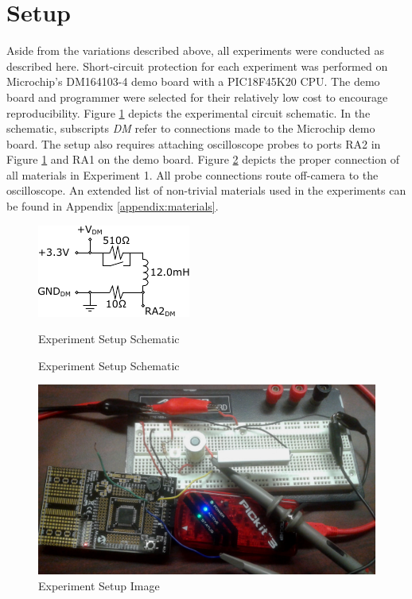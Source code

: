 \documentclass[11pt,oneside]{report}
\begin{document}
    \section*{Setup}
    Aside from the variations described above, all experiments were conducted as described here. Short-circuit protection for each experiment was performed on Microchip's DM164103-4 demo board with a PIC18F45K20 CPU. The demo board and programmer were selected for their relatively low cost to encourage reproducibility. 
    Figure \ref{fig:ExperimentSetup} depicts the experimental circuit schematic. In the schematic, subscripts \textit{DM} refer to connections made to the Microchip demo board. The setup also requires attaching oscilloscope probes to ports RA2 in Figure \ref{fig:ExperimentSetup} and RA1 on the demo board. Figure \ref{fig:Experiment1Setup} depicts the proper connection of all materials in Experiment 1. All probe connections route off-camera to the oscilloscope. An extended list of non-trivial materials used in the experiments can be found in Appendix \ref{appendix:materials}.
    \begin{figure}
        \centering
        \includegraphics[width=0.45\linewidth]{img/Experiment_Setup.pdf}
        \caption{Experiment Setup Schematic} Experiment Setup Schematic
        \label{fig:ExperimentSetup}
    \end{figure}
    
    \begin{figure}
    	\centering
        \includegraphics[width=0.75\linewidth]{img/SCD_5_9mH_EXP_SETUP.jpg}
        \caption{Experiment Setup Image}
        \label{fig:Experiment1Setup}
    \end{figure}
\end{document}
